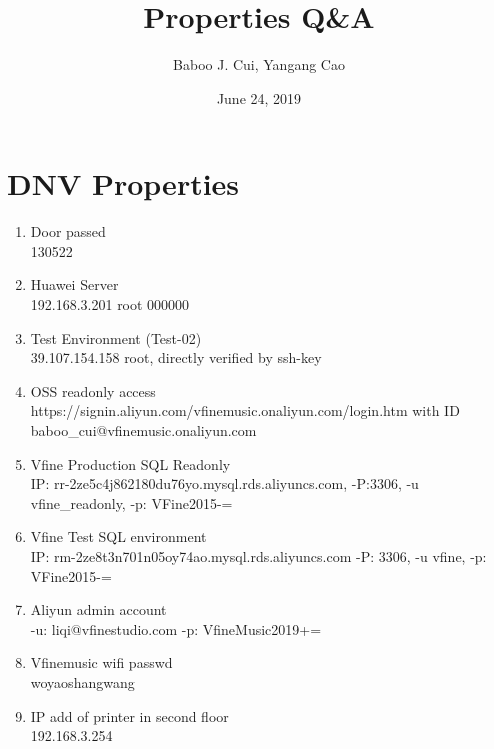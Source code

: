 \documentclass[10pt,a4paper,oneside]{article}
\date{June 24, 2019}
\author{Baboo J. Cui, Yangang Cao}
\title{Properties Q\&A}
\begin{document}
\maketitle
\tableofcontents

\newpage
\section{DNV Properties}
\begin{enumerate}[1.]
\item   Door passed    \\
130522
\item    Huawei Server   \\
192.168.3.201 root 000000
\item   Test Environment (Test-02)    \\
39.107.154.158 root, directly verified by ssh-key
\item    OSS readonly access   \\
https://signin.aliyun.com/vfinemusic.onaliyun.com/login.htm with ID baboo\_cui@vfinemusic.onaliyun.com
\item    Vfine Production SQL Readonly   \\
IP: rr-2ze5c4j862180du76yo.mysql.rds.aliyuncs.com, -P:3306, -u vfine\_readonly, -p: VFine2015-=
\item   Vfine Test SQL environment     \\
IP: rm-2ze8t3n701n05oy74ao.mysql.rds.aliyuncs.com -P: 3306, -u vfine, -p: VFine2015-=
\item   Aliyun admin account    \\
-u: liqi@vfinestudio.com  -p: VfineMusic2019+=
\item   Vfinemusic wifi passwd    \\
woyaoshangwang
\item    IP add of printer in second floor   \\
192.168.3.254
\end{enumerate}
\end{document}
